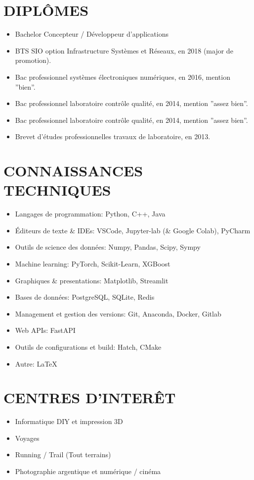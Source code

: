 \documentclass[a4paper,twoside]{article}
\begin{document}
\begin{multicols}{2}
    \section*{DIPLÔMES}
    \begin{itemize}
        \item Bachelor Concepteur / Développeur d’applications
        \item BTS SIO option Infrastructure Systèmes et Réseaux, en 2018 (major de promotion).
        \item Bac professionnel systèmes électroniques numériques, en 2016, mention ''bien''.
        \item Bac professionnel laboratoire contrôle qualité, en 2014, mention ''assez bien''.
        \item Bac professionnel laboratoire contrôle qualité, en 2014, mention ''assez bien''.
        \item Brevet d'études professionnelles travaux de laboratoire, en 2013.
    \end{itemize}

    \section*{CONNAISSANCES
      \newline TECHNIQUES}

    \begin{itemize}
        \item Langages de programmation: Python, C++, Java
        \item Éditeurs de texte \& IDEs: VSCode, Jupyter-lab (\& Google Colab), PyCharm
        \item Outils de science des données: Numpy, Pandas, Scipy, Sympy
        \item Machine learning: PyTorch, Scikit-Learn, XGBoost
        \item Graphiques \& presentations: Matplotlib, Streamlit
        \item Bases de données: PostgreSQL, SQLite, Redis
        \item Management et gestion des versions: Git, Anaconda, Docker, Gitlab
        \item Web APIs: FastAPI
        \item Outils de configurations et build: Hatch, CMake
        \item Autre: LaTeX
    \end{itemize}

    \section*{CENTRES D'INTERÊT}

    \begin{itemize}
        \item Informatique DIY et impression 3D
        \item Voyages
        \item Running / Trail (Tout terrains)
        \item Photographie argentique et numérique / cinéma
    \end{itemize}

\end{multicols}
\end{document}
